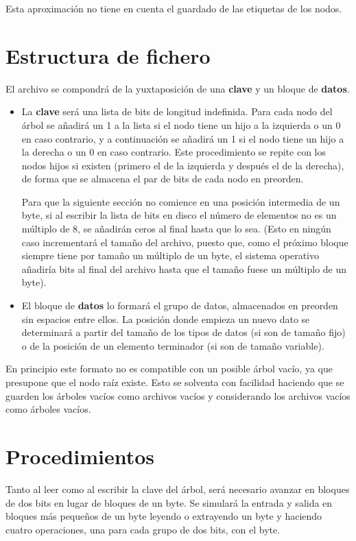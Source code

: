 \documentclass{article}
\begin{document}
Esta aproximación no tiene en cuenta el guardado de las etiquetas de los nodos.

\section{Estructura de fichero}

El archivo se compondrá de la yuxtaposición de una \textbf{clave} y un
bloque de \textbf{datos}.

\begin{itemize}
	\item La \textbf{clave} será una lista de bits de longitud indefinida.
  Para cada nodo del árbol se añadirá un 1 a la lista si el nodo tiene un hijo a
  la izquierda o un 0 en caso contrario, y a continuación se añadirá un 1 si el
  nodo tiene un hijo a la derecha o un 0 en caso contrario. Este procedimiento
  se repite con los nodos hijos si existen (primero el de la izquierda y después
  el de la derecha), de forma que se almacena el par de bits de cada nodo en preorden.

  Para que la siguiente sección no comience en una posición intermedia de un byte,
  si al escribir la lista de bits en disco el número de elementos no es un múltiplo
  de 8, se añadirán ceros al final hasta que lo sea. (Esto en ningún caso
  incrementará el tamaño del archivo, puesto que, como el próximo bloque siempre
  tiene por tamaño un múltiplo de un byte, el sistema operativo añadiría bits al
  final del archivo hasta que el tamaño fuese un múltiplo de un byte).
	\item El bloque de \textbf{datos} lo formará el grupo de datos, almacenados
  en preorden sin espacios entre ellos. La posición donde empieza un nuevo dato
  se determinará a partir del tamaño de los tipos de datos (si son de tamaño fijo)
  o de la posición de un elemento terminador (si son de tamaño variable).
\end{itemize}

En principio este formato no es compatible con un posible árbol vacío, ya que
presupone que el nodo raíz existe. Esto se solventa con facilidad haciendo que se
guarden los árboles vacíos como archivos vacíos y considerando los archivos vacíos
como árboles vacíos.

\section{Procedimientos}

Tanto al leer como al escribir la clave del árbol, será necesario avanzar en
bloques de dos bits en lugar de bloques de un byte. Se simulará la entrada y salida
en bloques más pequeños de un byte leyendo o extrayendo un byte y haciendo cuatro
operaciones, una para cada grupo de dos bits, con el byte.
\end{document}

